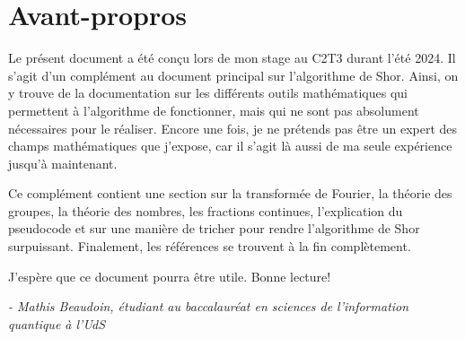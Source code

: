 \section*{Avant-propros}
Le présent document a été conçu lors de mon stage au C2T3 durant l'été 2024. Il s'agit d'un complément au document principal sur l'algorithme de Shor. Ainsi, on y trouve de la documentation sur les différents outils mathématiques qui permettent à l'algorithme de fonctionner, mais qui ne sont pas absolument nécessaires pour le réaliser. Encore une fois, je ne prétends pas être un expert des champs mathématiques que j'expose, car il s'agit là aussi de ma seule expérience jusqu'à maintenant.

Ce complément contient une section sur la transformée de Fourier, la théorie des groupes, la théorie des nombres, les fractions continues, l'explication du pseudocode et sur une manière de tricher pour rendre l'algorithme de Shor surpuissant. Finalement, les références se trouvent à la fin complètement.

J'espère que ce document pourra être utile. Bonne lecture!

\textit{- Mathis Beaudoin, étudiant au baccalauréat en sciences de l'information quantique à l'UdS}
